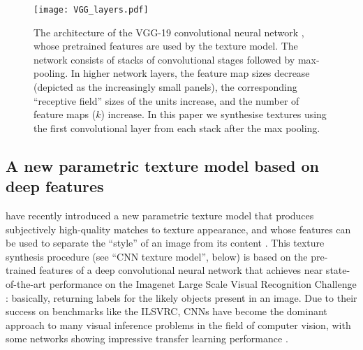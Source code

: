 \documentclass[doc, 11pt,a4paper,natbib]{apa6}\usepackage[]{graphicx}\usepackage[]{color}
\begin{document}
\begin{figure*}
\centering
\texttt{[image: VGG\_layers.pdf]}
\caption{
The architecture of the VGG-19 convolutional neural network \citep{simonyan_very_2015}, whose pretrained features are used by the \citet{gatys_texture_2015-1} texture model.
The network consists of stacks of convolutional stages followed by max-pooling. 
In higher network layers, the feature map sizes decrease (depicted as the increasingly small panels), the corresponding ``receptive field'' sizes of the units increase, and the number of feature maps ($k$) increase.
In this paper we synthesise textures using the first convolutional layer from each stack after the max pooling.
}
\label{fig:vgg}
\end{figure*}

\subsection{A new parametric texture model based on deep features}

\citet{gatys_texture_2015-1} have recently introduced a new parametric texture model that produces subjectively high-quality matches to texture appearance, and whose features can be used to separate the ``style'' of an image from its content \citep{gatys_image_2016}.
This texture synthesis procedure (see ``CNN texture model'', below) is based on the pre-trained features of a deep convolutional neural network  \citep[the VGG-19;][Figure \ref{fig:vgg}]{simonyan_very_2015} that achieves near state-of-the-art performance on the Imagenet Large Scale Visual Recognition Challenge \citep[ILSVRC;][]{imagenet_2015}: basically, returning labels for the likely objects present in an image.
Due to their success on benchmarks like the ILSVRC, CNNs have become the dominant approach to many visual inference problems in the field of computer vision, with some networks showing impressive transfer learning performance \citep[doing well on new tasks with only minimal changes to the network, e.g. ][]{donahue_decaf_2013}. 
\end{document}
